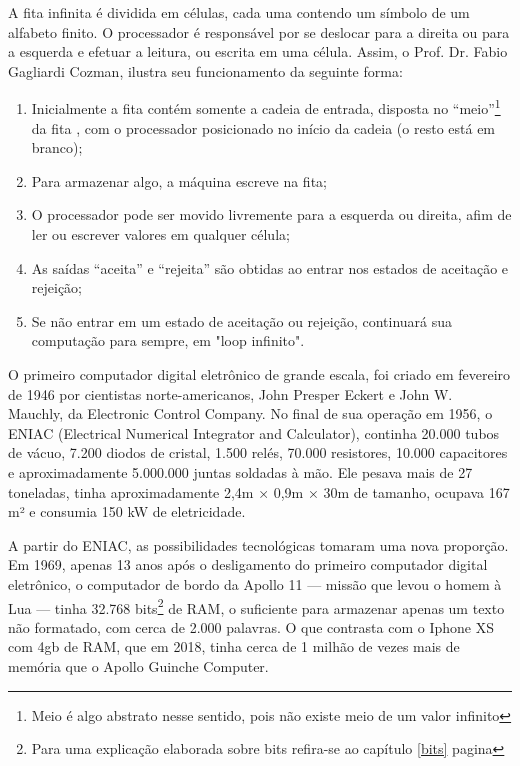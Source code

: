A fita infinita é dividida em células, cada uma contendo um símbolo de um alfabeto finito. O processador é responsável por se deslocar para a direita ou para a esquerda e efetuar a leitura, ou escrita em uma célula. Assim, o Prof. Dr. Fabio Gagliardi Cozman\cite{7}, ilustra seu funcionamento da seguinte forma:
\begin{enumerate}
  \item Inicialmente a fita contém somente a cadeia de entrada, disposta no “meio”\footnote{Meio é algo abstrato nesse sentido, pois não existe meio de um valor infinito} da fita , com o processador posicionado no início da cadeia (o resto está em branco);
  \item Para armazenar algo, a máquina escreve na fita;
  \item O processador pode ser movido livremente para a esquerda ou direita, afim de ler ou escrever valores em qualquer célula;
  \item As saídas ``aceita'' e ``rejeita'' são obtidas ao entrar nos estados de aceitação e rejeição;
  \item Se não entrar em um estado de aceitação ou rejeição, continuará sua computação para sempre, em "loop infinito".
\end{enumerate}

O primeiro computador digital eletrônico de grande escala, foi criado em fevereiro de 1946 por cientistas norte-americanos, John Presper Eckert e John W. Mauchly, da Electronic Control Company. No final de sua operação em 1956, o ENIAC (Electrical Numerical Integrator and Calculator), continha 20.000 tubos de vácuo, 7.200 diodos de cristal, 1.500 relés, 70.000 resistores, 10.000 capacitores e aproximadamente 5.000.000 juntas soldadas à mão. Ele pesava mais de 27 toneladas, tinha aproximadamente 2,4m × 0,9m × 30m de tamanho, ocupava 167 m² e consumia 150 kW de eletricidade.\cite{2}

A partir do ENIAC, as possibilidades tecnológicas tomaram uma nova proporção. Em 1969, apenas 13 anos após o desligamento do primeiro computador digital eletrônico, o computador de bordo da Apollo 11 — missão que levou o homem  à Lua — tinha 32.768 bits\footnote{Para uma explicação elaborada sobre bits refira-se ao capítulo \ref{bits} pagina \pageref{bits}} de RAM, o suficiente para armazenar apenas um texto não formatado, com cerca de 2.000 palavras. O que contrasta com o Iphone XS com 4gb de RAM, que em 2018, tinha cerca de 1 milhão de vezes mais de memória que o Apollo Guinche Computer. \cite{5}

